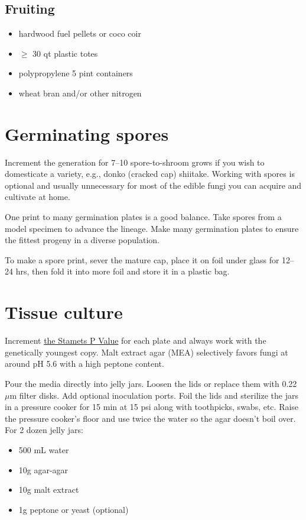 \documentclass{article}
\begin{document}
\subsection*{Fruiting}

\begin{itemize}
	\item hardwood fuel pellets or coco coir
	\item $\geq$ 30 qt plastic totes
	\item polypropylene 5 pint containers
	\item wheat bran and/or other nitrogen
\end{itemize}


\section*{Germinating spores}

Increment the generation for 7--10 spore-to-shroom grows if you wish to domesticate a variety, e.g., donko (cracked cap) shiitake.
Working with spores is optional and usually unnecessary for most of the edible fungi you can acquire and cultivate at home.

One print to many germination plates is a good balance.
Take spores from a model specimen to advance the lineage.
Make many germination plates to ensure the fittest progeny in a diverse population.

To make a spore print, sever the mature cap, place it on foil under glass for 12--24 hrs, then fold it into more foil and store it in a plastic bag.


\section*{Tissue culture}

Increment \href{http://www.fungi.com/blog/items/what-is-the-stamets-p-value-system.html}{the Stamets P Value} for each plate and always work with the genetically youngest copy.
Malt extract agar (MEA) selectively favors fungi at around pH 5.6 with a high peptone content.

Pour the media directly into jelly jars.
Loosen the lids or replace them with 0.22 $\mu$m filter disks.
Add optional inoculation ports.
Foil the lids and sterilize the jars in a pressure cooker for 15 min at 15 psi along with toothpicks, swabs, etc.
Raise the pressure cooker's floor and use twice the water so the agar doesn't boil over.
For 2 dozen jelly jars:

\begin{itemize}
	\item 500 mL water
	\item 10g agar-agar
	\item 10g malt extract
	\item 1g peptone or yeast (optional)
\end{itemize}
\end{document}
